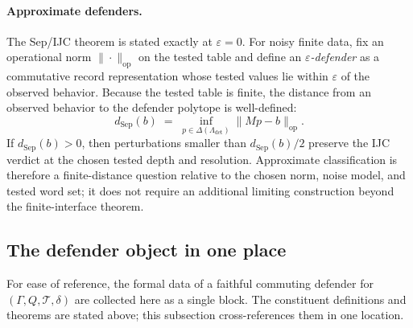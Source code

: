 \documentclass[11pt]{article}
\begin{document}
\paragraph{Approximate defenders.}
The Sep/IJC theorem is stated exactly at $\varepsilon = 0$.  For
noisy finite data, fix an operational norm
$\|\cdot\|_{\mathrm{op}}$ on the tested table and define an
\emph{$\varepsilon$-defender} as a commutative record representation
whose tested values lie within $\varepsilon$ of the observed
behavior.  Because the tested table is finite, the distance from an
observed behavior to the defender polytope is well-defined:
\[
    d_{\mathrm{Sep}}(b)
    \;=\;
    \inf_{p\in\Delta(\Lambda_{\mathrm{det}})}
    \|Mp - b\|_{\mathrm{op}}.
\]
If $d_{\mathrm{Sep}}(b) > 0$, then perturbations smaller than
$d_{\mathrm{Sep}}(b)/2$ preserve the IJC verdict at the chosen
tested depth and resolution.  Approximate classification is
therefore a finite-distance question relative to the chosen norm,
noise model, and tested word set; it does not require an additional
limiting construction beyond the finite-interface theorem.

\subsection{The defender object in one place}\label{subsec:defender-object-consolidated}

For ease of reference, the formal data of a faithful commuting
defender for $(\Gamma,Q,\mathcal T,\delta)$ are collected here as a
single block.  The constituent definitions and theorems are stated
above; this subsection cross-references them in one location.
\end{document}
